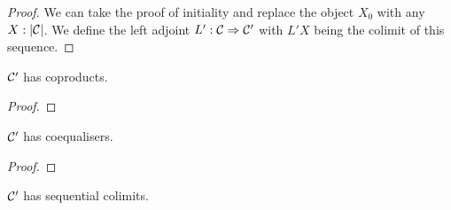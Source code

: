 \begin{proof}
  We can take the proof of initiality and replace the object $X_0$
  with any $X : | \mathcal{C} |$. We define the left adjoint
  $L' : \mathcal{C} \Rightarrow \mathcal{C}'$ with $L' X$ being the colimit of this
  sequence.
\end{proof}

\begin{proposition}
  $\mathcal{C}'$ has coproducts.
\end{proposition}

\begin{proof}
\end{proof}

\begin{proposition}
  $\mathcal{C}'$ has coequalisers.
\end{proposition}

\begin{proof}
\end{proof}

\begin{proposition}
  $\mathcal{C}'$ has sequential colimits.
\end{proposition}

